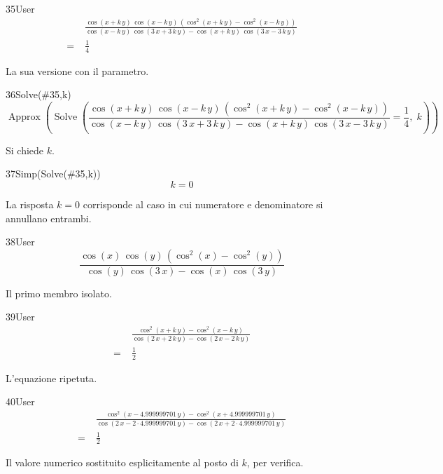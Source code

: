 \begin{espr}{35}{User}{\verificata}
\begin{align*}
& \frac{\cos\!\left(x + k\, y\right)\, \cos\!\left(x - k\, y\right)\, \left(\cos^{2}\!\left(x + k\, y\right) - \cos^{2}\!\left(x - k\, y\right)\right)}{\cos\!\left(x - k\, y\right)\, \cos\!\left(3\, x + 3\, k\, y\right) - \cos\!\left(x + k\, y\right)\, \cos\!\left(3\, x - 3\, k\, y\right)} \\
=\;& \frac{1}{4}
\end{align*}
\end{espr}
La sua versione con il parametro.

\begin{espr}{36}{Solve(\#35,k)}{}
\[
\operatorname{Approx}\!\left(\operatorname{Solve}\!\left(\frac{\cos\!\left(x + k\, y\right)\, \cos\!\left(x - k\, y\right)\, \left(\cos^{2}\!\left(x + k\, y\right) - \cos^{2}\!\left(x - k\, y\right)\right)}{\cos\!\left(x - k\, y\right)\, \cos\!\left(3\, x + 3\, k\, y\right) - \cos\!\left(x + k\, y\right)\, \cos\!\left(3\, x - 3\, k\, y\right)} = \frac{1}{4},\; k\right)\right)
\]
\end{espr}
Si chiede $k$.

\begin{espr}{37}{Simp(Solve(\#35,k))}{}
\[
k = 0
\]
\end{espr}
La risposta $k=0$ corrisponde al caso in cui numeratore e denominatore si annullano entrambi.

\begin{espr}{38}{User}{}
\[
\frac{\cos\!\left(x\right)\, \cos\!\left(y\right)\, \left(\cos^{2}\!\left(x\right) - \cos^{2}\!\left(y\right)\right)}{\cos\!\left(y\right)\, \cos\!\left(3\, x\right) - \cos\!\left(x\right)\, \cos\!\left(3\, y\right)}
\]
\end{espr}
Il primo membro isolato.

\begin{espr}{39}{User}{\verificata}
\begin{align*}
& \frac{\cos^{2}\!\left(x + k\, y\right) - \cos^{2}\!\left(x - k\, y\right)}{\cos\!\left(2\, x + 2\, k\, y\right) - \cos\!\left(2\, x - 2\, k\, y\right)} \\
=\;& \frac{1}{2}
\end{align*}
\end{espr}
L'equazione ripetuta.

\begin{espr}{40}{User}{\verificata}
\begin{align*}
& \frac{\cos^{2}\!\left(x - 4.999999701\, y\right) - \cos^{2}\!\left(x + 4.999999701\, y\right)}{\cos\!\left(2\, x - 2 \cdot 4.999999701\, y\right) - \cos\!\left(2\, x + 2 \cdot 4.999999701\, y\right)} \\
=\;& \frac{1}{2}
\end{align*}
\end{espr}
Il valore numerico sostituito esplicitamente al posto di $k$, per verifica.

